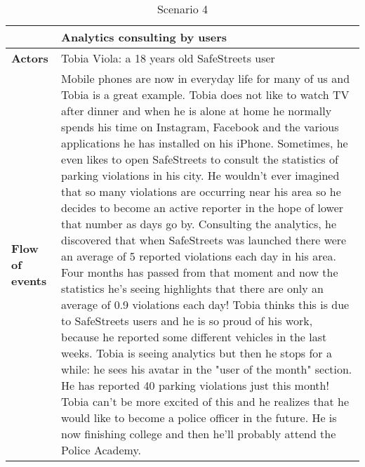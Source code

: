 \begin{table}[!htbp]
	\centering
\begin{tabular}{lp{9cm}}
\hline
\bf\large  &\bf\large Analytics consulting by users\\
\hline
\hline

\bf Actors&Tobia Viola: a 18 years old SafeStreets user\\
\hline
\bf Flow of events&
Mobile phones are now in everyday life for many of us and Tobia is a great example. Tobia does not like to watch TV after dinner and when he is alone at home he normally spends his time on Instagram, Facebook and the various applications he has installed on his iPhone.
Sometimes, he even likes to open SafeStreets to consult the statistics of parking violations in his city.
He wouldn't ever imagined that so many violations are occurring near his area so he decides to become an active reporter in the hope of lower that number as days go by.
Consulting the analytics, he discovered that when SafeStreets was launched there were an average of 5 reported violations each day in his area.
Four months has passed from that moment and now the statistics he's seeing highlights that there are only an average of 0.9 violations each day! 
Tobia thinks this is due to SafeStreets users and he is so proud of his work, because he reported some different vehicles in the last weeks.
Tobia is seeing analytics but then he stops for a while:  he sees his avatar in the "user of the month" section. He has reported 40 parking violations just this month!
Tobia can't be more excited of this and he realizes that he would like to become a police officer in the future.
He is now finishing college and then he'll probably attend the Police Academy.
\end{tabular}
\caption{Scenario 4} 
\label{tab:scenariofour}
\end{table}